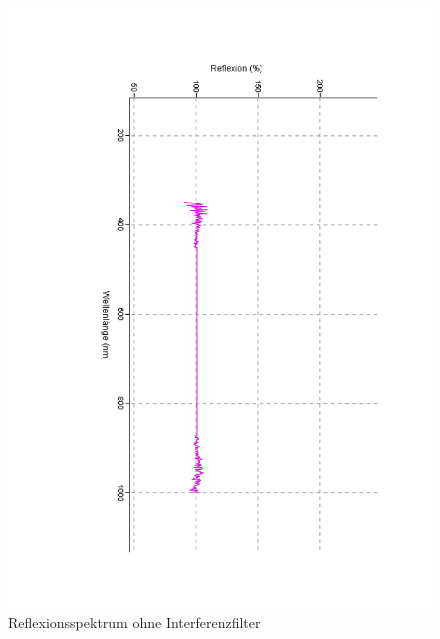 \documentclass[12pt,a4paper]{article}
\begin{document}
\begin{figure}[H]
	\centering
	\includegraphics[scale=0.5,angle = 90,trim = 20mm 20mm 20mm 20mm]{./data/Spektro/Interferenzfilter_Leer.pdf}
	\caption{Reflexionsspektrum ohne Interferenzfilter}
	\label{fig:InterferenzOhne}
\end{figure}
\end{document}
